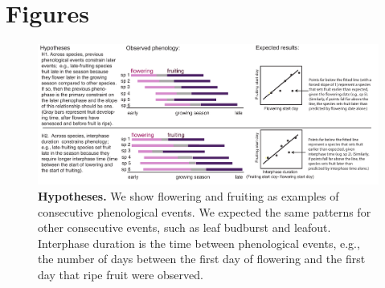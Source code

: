 \documentclass{article}
\begin{document}
\section* {Figures}
\begin{figure}[p]
 \centering
 \includegraphics{../analyses/figures/hypotheses3.pdf} 
  
 \caption{\textbf{Hypotheses.} We show flowering and fruiting as examples of consecutive phenological events. We expected the same patterns for other consecutive events, such as leaf budburst and leafout. Interphase duration is the time between phenological events, e.g., the number of days between the first day of flowering and the first day that ripe fruit were observed.} 
 \label{fig:hyp}
\end{figure}
 
\end{document}
